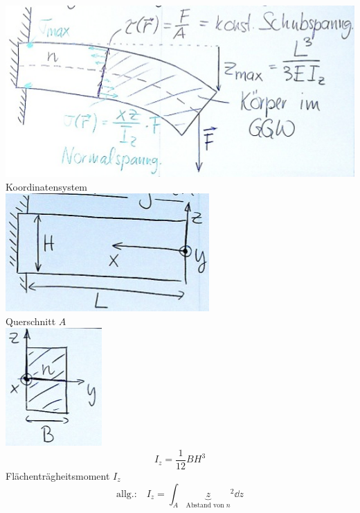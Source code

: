 \begin{rep*}[ note = Verteilung von Spannungen in festen Körper ]
	\begin{bsp*}[ note = Biegebelastung von Balken ]
		\includegraphics{Bild52} \\
		Koordinatensystem \\
		\includegraphics{Bild53} \\
		Querschnitt $A$ \\
		\includegraphics{Bild54}
		\[ I_z = \frac{1}{12} BH^3 \]
		Flächenträgheitsmoment $I_z$
		\[ \text{allg.:} \quad I_z = \int_A {\underbrace{z}_{\text{Abstand von $n$}}}^2 \dd z \]
	\end{bsp*}
\end{rep*}
